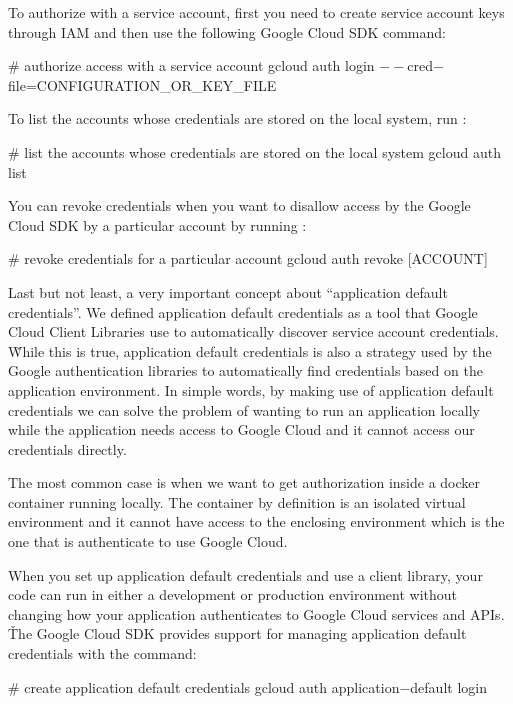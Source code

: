To authorize with a service account, first you need to create service account keys through IAM and then use the
following Google Cloud SDK command:
\begin{bash}
# authorize access with a service account
gcloud auth login $--$cred$-$file=CONFIGURATION\_OR\_KEY\_FILE
\end{bash}

To list the accounts whose credentials are stored on the local system, run :
\begin{bash}
# list the accounts whose credentials are stored on the local system
gcloud auth list
\end{bash}

You can revoke credentials when you want to disallow access by the Google Cloud SDK by a particular account by running
:
\begin{bash}
# revoke credentials for a particular account
gcloud auth revoke [ACCOUNT]
\end{bash}

Last but not least, a very important concept about ``application default credentials''. We defined application
default credentials as a tool that Google Cloud Client Libraries use to automatically discover service account
credentials. \v

While this is true, application default credentials is also a strategy used by the Google authentication libraries to
automatically find credentials based on the application environment. In simple words, by making use of application
default credentials we can solve the problem of wanting to run an application locally while the application needs
access to Google Cloud and it cannot access our credentials directly.

\be
The most common case is when we want to get authorization inside a docker container running locally. The container by
definition is an isolated virtual environment and it cannot have access to the enclosing environment which is the one
that is authenticate to use Google Cloud.
\ee

When you set up application default credentials and use a client library, your code can run in either a development
or production environment without changing how your application authenticates to Google Cloud services and APIs. \v

The Google Cloud SDK provides support for managing application default credentials with the command:
\begin{bash}
# create application default credentials
gcloud auth application$-$default login
\end{bash}

